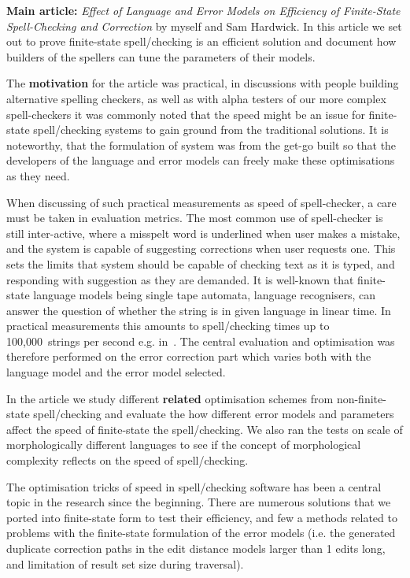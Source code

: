 \documentclass[officiallayout]{unihelcompling}
\begin{document}
\textbf{Main article:} \emph{Effect of Language and Error Models on Efficiency
of Finite-State Spell-Checking and Correction} by myself and Sam Hardwick. In
this article we set out to prove finite-state spell\-/checking is an efficient
solution and document how builders of the spellers can tune the parameters
of their models.

The \textbf{motivation} for the article was practical, in discussions with
people building alternative spelling checkers, as well as with alpha testers of
our more complex spell-checkers it was commonly noted that the speed might be
an issue for finite-state spell\-/checking systems to gain ground from the
traditional solutions. It is noteworthy, that the formulation of system was
from the get-go built so that the developers of the language and error models
can freely make these optimisations as they need.

When discussing of such practical measurements as speed of spell-checker, a
care must be taken in evaluation metrics. The most common use of spell-checker
is still inter-active, where a misspelt word is underlined when user makes a
mistake, and the system is capable of suggesting corrections when user requests
one. This sets the limits that system should be capable of checking text as it
is typed, and responding with suggestion as they are demanded. It is well-known
that finite-state language models being single tape automata, language
recognisers, can answer the question of whether the string is in given language
in linear time. In practical measurements this amounts to spell\-/checking times
up to 100,000~strings per second e.g. in~\citet{silfverberg2009hfst}. The
central evaluation and optimisation was therefore performed on the error
correction part which varies both with the language model and the error model
selected.

In the article we study different \textbf{related} optimisation schemes from
non-finite-state spell\-/checking and evaluate the how different error models and
parameters affect the speed of finite-state the spell\-/checking. We also ran the
tests on scale of morphologically different languages to see if the concept of
morphological complexity reflects on the speed of spell\-/checking.

The optimisation tricks of speed in spell\-/checking software has been a central
topic in the research since the beginning. There are numerous solutions that we
ported into finite-state form to test their efficiency, and few a methods
related to problems with the finite-state formulation of the error models (i.e.
the generated duplicate correction paths in the edit distance models larger
than 1 edits long, and limitation of result set size during traversal).
\end{document}
